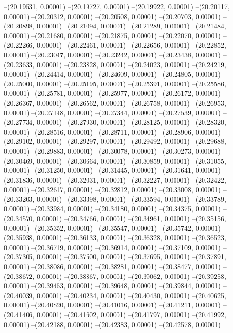 --(20.19531, 0.00001)
--(20.19727, 0.00001)
--(20.19922, 0.00001)
--(20.20117, 0.00001)
--(20.20312, 0.00001)
--(20.20508, 0.00001)
--(20.20703, 0.00001)
--(20.20898, 0.00001)
--(20.21094, 0.00001)
--(20.21289, 0.00001)
--(20.21484, 0.00001)
--(20.21680, 0.00001)
--(20.21875, 0.00001)
--(20.22070, 0.00001)
--(20.22266, 0.00001)
--(20.22461, 0.00001)
--(20.22656, 0.00001)
--(20.22852, 0.00001)
--(20.23047, 0.00001)
--(20.23242, 0.00001)
--(20.23438, 0.00001)
--(20.23633, 0.00001)
--(20.23828, 0.00001)
--(20.24023, 0.00001)
--(20.24219, 0.00001)
--(20.24414, 0.00001)
--(20.24609, 0.00001)
--(20.24805, 0.00001)
--(20.25000, 0.00001)
--(20.25195, 0.00001)
--(20.25391, 0.00001)
--(20.25586, 0.00001)
--(20.25781, 0.00001)
--(20.25977, 0.00001)
--(20.26172, 0.00001)
--(20.26367, 0.00001)
--(20.26562, 0.00001)
--(20.26758, 0.00001)
--(20.26953, 0.00001)
--(20.27148, 0.00001)
--(20.27344, 0.00001)
--(20.27539, 0.00001)
--(20.27734, 0.00001)
--(20.27930, 0.00001)
--(20.28125, 0.00001)
--(20.28320, 0.00001)
--(20.28516, 0.00001)
--(20.28711, 0.00001)
--(20.28906, 0.00001)
--(20.29102, 0.00001)
--(20.29297, 0.00001)
--(20.29492, 0.00001)
--(20.29688, 0.00001)
--(20.29883, 0.00001)
--(20.30078, 0.00001)
--(20.30273, 0.00001)
--(20.30469, 0.00001)
--(20.30664, 0.00001)
--(20.30859, 0.00001)
--(20.31055, 0.00001)
--(20.31250, 0.00001)
--(20.31445, 0.00001)
--(20.31641, 0.00001)
--(20.31836, 0.00001)
--(20.32031, 0.00001)
--(20.32227, 0.00001)
--(20.32422, 0.00001)
--(20.32617, 0.00001)
--(20.32812, 0.00001)
--(20.33008, 0.00001)
--(20.33203, 0.00001)
--(20.33398, 0.00001)
--(20.33594, 0.00001)
--(20.33789, 0.00001)
--(20.33984, 0.00001)
--(20.34180, 0.00001)
--(20.34375, 0.00001)
--(20.34570, 0.00001)
--(20.34766, 0.00001)
--(20.34961, 0.00001)
--(20.35156, 0.00001)
--(20.35352, 0.00001)
--(20.35547, 0.00001)
--(20.35742, 0.00001)
--(20.35938, 0.00001)
--(20.36133, 0.00001)
--(20.36328, 0.00001)
--(20.36523, 0.00001)
--(20.36719, 0.00001)
--(20.36914, 0.00001)
--(20.37109, 0.00001)
--(20.37305, 0.00001)
--(20.37500, 0.00001)
--(20.37695, 0.00001)
--(20.37891, 0.00001)
--(20.38086, 0.00001)
--(20.38281, 0.00001)
--(20.38477, 0.00001)
--(20.38672, 0.00001)
--(20.38867, 0.00001)
--(20.39062, 0.00001)
--(20.39258, 0.00001)
--(20.39453, 0.00001)
--(20.39648, 0.00001)
--(20.39844, 0.00001)
--(20.40039, 0.00001)
--(20.40234, 0.00001)
--(20.40430, 0.00001)
--(20.40625, 0.00001)
--(20.40820, 0.00001)
--(20.41016, 0.00001)
--(20.41211, 0.00001)
--(20.41406, 0.00001)
--(20.41602, 0.00001)
--(20.41797, 0.00001)
--(20.41992, 0.00001)
--(20.42188, 0.00001)
--(20.42383, 0.00001)
--(20.42578, 0.00001)
